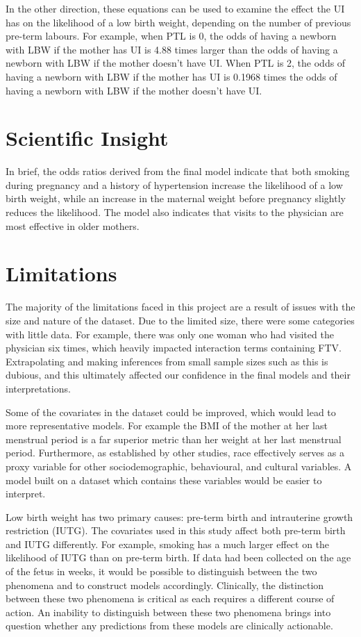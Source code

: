 In the other direction, these equations can be used to examine the effect the UI has on the likelihood of a low birth weight, depending on the number of previous pre-term labours. For example, when PTL is 0, the odds of having a newborn with LBW if the mother has UI is 4.88 times larger than the odds of having a newborn with LBW if the mother doesn’t have UI. When PTL is 2, the odds of having a newborn with LBW if the mother has UI is 0.1968 times the odds of having a newborn with LBW if the mother doesn’t have UI.

\newpage
\section{Scientific Insight}
In brief, the odds ratios derived from the final model indicate that both smoking during pregnancy and a history of hypertension increase the likelihood of a low birth weight, while an increase in the maternal weight before pregnancy slightly reduces the likelihood. The model also indicates that visits to the physician are most effective in older mothers. 


\section{Limitations}
The majority of the limitations faced in this project are a result of issues with the size and nature of the dataset. Due to the limited size, there were some categories with little data. For example, there was only one woman who had visited the physician six times, which heavily impacted interaction terms containing FTV. Extrapolating and making inferences from small sample sizes such as this is dubious, and this ultimately affected our confidence in the final models and their interpretations.

Some of the covariates in the dataset could be improved, which would lead to more representative models. For example the BMI of the mother at her last menstrual period is a far superior metric than her weight at her last menstrual period. Furthermore, as established by other studies, race effectively serves as a proxy variable for other sociodemographic, behavioural, and cultural variables. A model built on a dataset which contains these variables would be easier to interpret.

Low birth weight has two primary causes: pre-term birth and intrauterine growth restriction (IUTG). The covariates used in this study affect both pre-term birth and IUTG differently. For example, smoking has a much larger effect on the likelihood of IUTG than on pre-term birth. If data had been collected on the age of the fetus in weeks, it would be possible to distinguish between the two phenomena and to construct models accordingly. Clinically, the distinction between these two phenomena is critical as each requires a different course of action. An inability to distinguish between these two phenomena brings into question whether any predictions from these models are clinically actionable.

